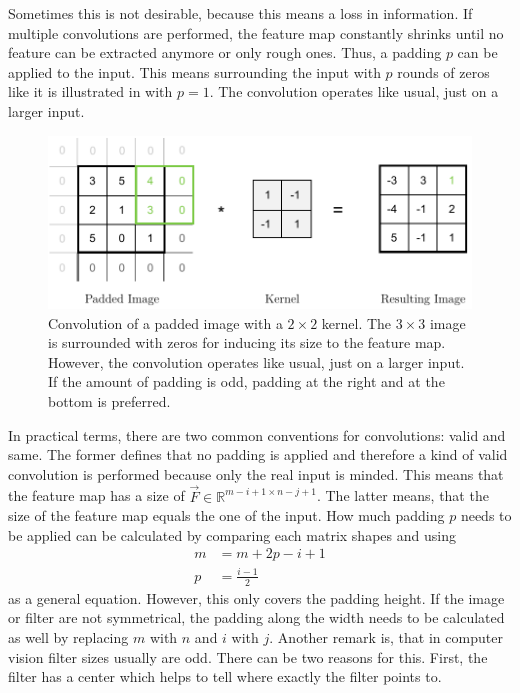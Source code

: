 Sometimes this is not desirable, because this means a loss in information.
If multiple convolutions are performed, the feature map constantly shrinks until no feature can be extracted anymore or only rough ones.
Thus, a padding $p$ can be applied to the input.
This means surrounding the input with $p$ rounds of zeros like it is illustrated in  with $p=1$.
The convolution operates like usual, just on a larger input.
\begin{figure}
	\centering
	\includegraphics{images/convolution_padding.pdf}
	\caption[Convolution of a Padded Image with a Kernel]{Convolution of a padded image with a $2 \times 2$ kernel. The $3 \times 3$ image is surrounded with zeros for inducing its size to the feature map. However, the convolution operates like usual, just on a larger input. If the amount of padding is odd, padding at the right and at the bottom is preferred.}
	\label{fig:convolution-padding}
\end{figure}
In practical terms, there are two common conventions for convolutions: valid and same.
The former defines that no padding is applied and therefore a kind of valid convolution is performed because only the real input is minded.
This means that the feature map has a size of $\vec{F} \in \mathbb{R}^{m-i+1 \times n-j+1}$.
The latter means, that the size of the feature map equals the one of the input.
How much padding $p$ needs to be applied can be calculated by comparing each matrix shapes and using
\begin{align}
	m &= m+2p-i+1 \\
	p &= \frac{i-1}{2}
\end{align}
as a general equation.
However, this only covers the padding height.
If the image or filter are not symmetrical, the padding along the width needs to be calculated as well by replacing $m$ with $n$ and $i$ with $j$.
Another remark is, that in computer vision filter sizes usually are odd.
There can be two reasons for this.
First, the filter has a center which helps to tell where exactly the filter points to.
